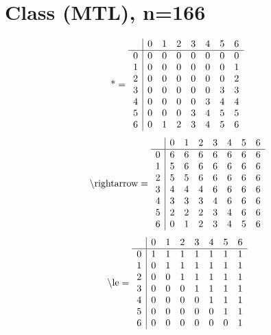 \documentclass[11pt]{article}
\begin{document}
\section{Class (MTL), n=166}
\[\text{*} = 
\begin{array}{r | r r r r r r r}
 & 0 & 1 & 2 & 3 & 4 & 5 & 6 \\ \hline
0 & 0 & 0 & 0 & 0 & 0 & 0 & 0 \\
1 & 0 & 0 & 0 & 0 & 0 & 0 & 1 \\
2 & 0 & 0 & 0 & 0 & 0 & 0 & 2 \\
3 & 0 & 0 & 0 & 0 & 0 & 3 & 3 \\
4 & 0 & 0 & 0 & 0 & 3 & 4 & 4 \\
5 & 0 & 0 & 0 & 3 & 4 & 5 & 5 \\
6 & 0 & 1 & 2 & 3 & 4 & 5 & 6 \\
\end{array}
\]
\[\text{\textbackslash rightarrow} = 
\begin{array}{r | r r r r r r r}
 & 0 & 1 & 2 & 3 & 4 & 5 & 6 \\ \hline
0 & 6 & 6 & 6 & 6 & 6 & 6 & 6 \\
1 & 5 & 6 & 6 & 6 & 6 & 6 & 6 \\
2 & 5 & 5 & 6 & 6 & 6 & 6 & 6 \\
3 & 4 & 4 & 4 & 6 & 6 & 6 & 6 \\
4 & 3 & 3 & 3 & 4 & 6 & 6 & 6 \\
5 & 2 & 2 & 2 & 3 & 4 & 6 & 6 \\
6 & 0 & 1 & 2 & 3 & 4 & 5 & 6 \\
\end{array}
\]
\[\text{\textbackslash le} = 
\begin{array}{r | r r r r r r r}
 & 0 & 1 & 2 & 3 & 4 & 5 & 6 \\ \hline
0 & 1 & 1 & 1 & 1 & 1 & 1 & 1 \\
1 & 0 & 1 & 1 & 1 & 1 & 1 & 1 \\
2 & 0 & 0 & 1 & 1 & 1 & 1 & 1 \\
3 & 0 & 0 & 0 & 1 & 1 & 1 & 1 \\
4 & 0 & 0 & 0 & 0 & 1 & 1 & 1 \\
5 & 0 & 0 & 0 & 0 & 0 & 1 & 1 \\
6 & 0 & 0 & 0 & 0 & 0 & 0 & 1 \\
\end{array}
\]
\end{document}
